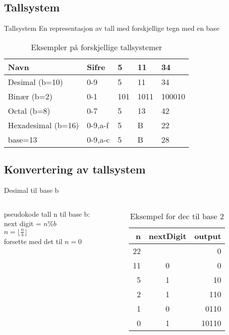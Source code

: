 \subsection*{Tallsystem}
\begin{frame}
\begin{block}{Tallsystem}
En representasjon av tall med forskjellige tegn med en base
\end{block}
\pause

\medskip

\begin{table}[]
\centering
\label{tab:tallsystemer}
\begin{tabular}{l|l|l|l|l}
Navn & Sifre & 5 & 11 & 34 \\ \hline
Desimal (b=10) & 0-9 & 5& 11 & 34 \\
Binær (b=2) & 0-1 & 101 & 1011 & 100010 \\
Octal (b=8) & 0-7 & 5&  13 & 42\\
Hexadesimal (b=16) & 0-9,a-f& 5& B& 22\\
base=13 & 0-9,a-c & 5& B& 28
\end{tabular}
\caption{Eksempler på forskjellige tallsystemer}
\end{table}
\end{frame}

\subsection*{Konvertering av tallsystem}
\begin{frame}[fragile]{Desimal til base b}
\begin{columns}
    \begin{column}{0.30\textwidth}
    \begin{block}{pseudokode}
            tall n til base b:\\
            next digit = $n\%b$\\
            $n=\lfloor \frac{n}{b} \rfloor$\\
            forsette med det til $n=0$
    \end{block}
    \end{column}
 	\pause
    \begin{column}{0.66\textwidth}
\begin{table}
\begin{tabular}{r|c|r}
n & nextDigit & output \\ \hline
22 & & 0 \\
11 & 0 & 0\\
5 & 1 & 10\\
2 & 1 & 110\\
1 & 0 & 0110\\
0 & 1 & 10110
\end{tabular}
\caption{Eksempel for dec til base 2}
\end{table}
 	\end{column}
 	\end{columns}
\end{frame}

